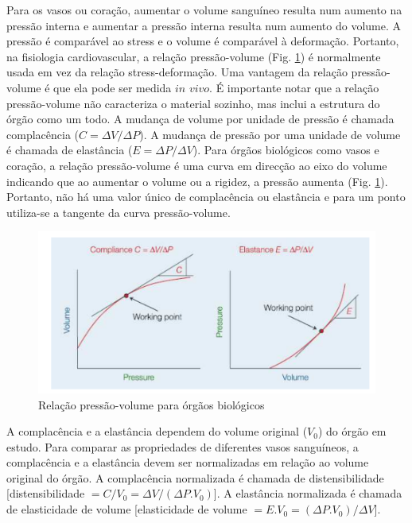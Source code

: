 \documentclass[
  portuguese,
  ]{book}
\begin{document}
Para os vasos ou coração, aumentar o volume sanguíneo resulta num aumento na pressão interna e aumentar a pressão interna resulta num aumento do volume. A pressão é comparável ao stress e o volume é comparável à deformação. Portanto, na fisiologia cardiovascular, a relação pressão-volume (Fig. \ref{fig:imghemo8}) é normalmente usada em vez da relação stress-deformação. Uma vantagem da relação pressão-volume é que ela pode ser medida \(\textit{in vivo}\). É importante notar que a relação pressão-volume não caracteriza o material sozinho, mas inclui a estrutura do órgão como um todo. A mudança de volume por unidade de pressão é chamada complacência (\(C = \Delta V / \Delta P\)). A mudança de pressão por uma unidade de volume é chamada de elastância (\(E = \Delta P / \Delta V\)). Para órgãos biológicos como vasos e coração, a relação pressão-volume é uma curva em direcção ao eixo do volume indicando que ao aumentar o volume ou a rigidez, a pressão aumenta (Fig. \ref{fig:imghemo8}). Portanto, não há uma valor único de complacência ou elastância e para um ponto utiliza-se a tangente da curva pressão-volume.

\begin{figure}

{\centering \includegraphics{img/hemo_8} 

}

\caption{Relação pressão-volume para órgãos biológicos}\label{fig:imghemo8}
\end{figure}

A complacência e a elastância dependem do volume original (\(V_0\)) do órgão em estudo. Para comparar as propriedades de diferentes vasos sanguíneos, a complacência e a elastância devem ser normalizadas em relação ao volume original do órgão. A complacência normalizada é chamada de distensibilidade {[}distensibilidade \(= C / V_0 = \Delta V / (\Delta P.V_0)\){]}. A elastância normalizada é chamada de elasticidade de volume {[}elasticidade de volume \(= E.V_0 = (\Delta P.V_0) / \Delta V\){]}.
\end{document}
